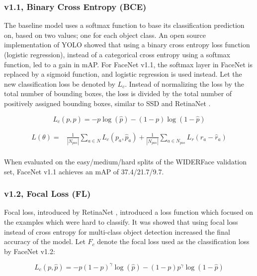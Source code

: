 \documentclass[a4paper, twoside]{article}
\begin{document}
\subsubsection{v1.1, Binary Cross Entropy (BCE)}
The baseline model uses a softmax function to base its classification prediction on, based on two values; one for each object class. An open source implementation of YOLO \cite{sigmoidvssoftmax} showed that using a binary cross entropy loss function (logistic regression), instead of a categorical cross entropy using a softmax function, led to a gain in mAP. For FaceNet v1.1, the softmax layer in FaceNet is replaced by a sigmoid function, and logistic regression is used instead. Let the new classification loss be denoted by $L_c$. Instead of normalizing the loss by the total number of bounding boxes, the loss is divided by the total number of positively assigned bounding boxes, similar to SSD \cite{ssd} and RetinaNet \cite{retinanet}.

\begin{equation}
L_c(p, \hat{p}) = -p \log{(\hat{p})} -(1-p) \log{(1-\hat{p})}
\end{equation}

\begin{equation}
\begin{split}
	L(\theta) = &  \frac{1}{|N_{pos}|} \sum_{a \in N} L_c(p_a, \hat{p}_a) 
	 + \frac{1}{|N_{pos}|} \sum_{a \in N_{pos}} L_r(r_a - \hat{r}_a)  \\ 
\end{split}
\end{equation}

When evaluated on the easy/medium/hard splits of the WIDERFace validation set, FaceNet v1.1 achieves an mAP of 37.4/21.7/9.7. 

\subsubsection{v1.2, Focal Loss (FL)}
Focal loss, introduced by RetinaNet \cite{retinanet}, introduced a loss function which focused on the examples which were hard to classify. It was showed that using focal loss instead of cross entropy for multi-class object detection increased the final accuracy of the model. Let $F_c$ denote the focal loss used as the classification loss by FaceNet v1.2:

\begin{equation}
L_c(p, \hat{p}) = -p (1-p)^\gamma \log{(\hat{p})} -(1-p) p^\gamma\log{(1-\hat{p})}
\end{equation}
\end{document}
